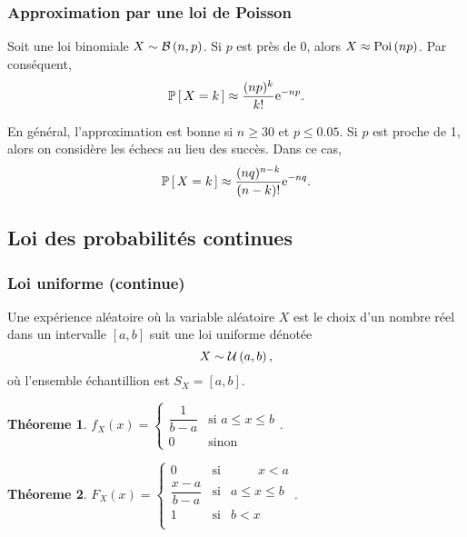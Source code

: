 \documentclass[11pt]{article}
\renewcommand\P[1]{%
	\ensuremath{%
		\mathbb{P}\left[\,#1\,\right]%
	}%
}%
\newcommand\e{%
	\ensuremath{%
		\mathrm{e}%
	}%
}%
\newcommand\Bin[2]{%
	\ensuremath{%
		\mathcal{B}\left(#1,#2\right)%
	}%
}%
\newcommand\Poi[1]{%
	\ensuremath{%
		\mathrm{Poi}\left(#1\right)%
	}%
}%
\newcommand\Uni[2]{%
	\ensuremath{%
		\mathcal{U}\left(#1,#2\right)%
	}%
}%
\newtheorem{theoreme}{Théoreme}[section]
\begin{document}
\subsubsection{Approximation par une loi de Poisson}
Soit une loi binomiale $X\sim\Bin{n}{p}$. Si $p$ est près de $0$, alors
$X\approx\Poi{np}$. Par conséquent,
\begin{equation*}
	\P{X=k}\approx\frac{(np)^k}{k!}\e^{-np}.
\end{equation*}

En général, l'approximation est bonne si $n\geq 30$ et $p\leq 0.05$. Si $p$
est proche de 1, alors on considère les échecs au lieu des succès. Dans ce cas,
\begin{equation*}
	\P{X=k}\approx\frac{(nq)^{n-k}}{(n-k)!}\e^{-nq}.
\end{equation*}

\subsection{Loi des probabilités continues}
\subsubsection{Loi uniforme (continue)}
Une expérience aléatoire où la variable aléatoire $X$ est le choix d'un nombre
réel dans un intervalle $[a,b]$ suit une loi uniforme dénotée
\begin{equation*}
	X\sim\Uni{a}{b},
\end{equation*}
où l'ensemble échantillion est $S_X=[a,b]$.

\begin{theoreme}
	$f_X(x)=\left\{
		\begin{matrix}
			\dfrac{1}{b-a} &\text{si } a\leq x\leq b\\
			0              &\text{sinon}
		\end{matrix}
	\right..
	$
\end{theoreme}

\begin{theoreme}
	$F_X(x)=\left\{
		\begin{matrix}
			0                &\text{si}& \;\phantom{a\leq}x<a\\
			\dfrac{x-a}{b-a} &\text{si}& a\leq x\leq b\\
			1                &\text{si}& b<x\phantom{\leq b}\;\\
		\end{matrix}
	\right.$.
\end{theoreme}
\end{document}
